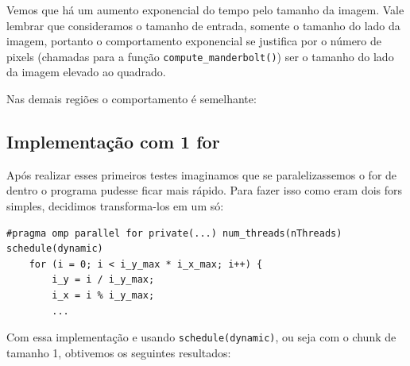 \documentclass[12pt]{article}
\newcommand{\code}[1]{\texttt{#1}}
\begin{document}
Vemos que há um aumento exponencial do tempo pelo tamanho da imagem. Vale lembrar que consideramos o tamanho de entrada, somente o tamanho do lado da imagem, portanto o comportamento exponencial se justifica por o número de pixels (chamadas para a função \code{compute\_manderbolt()}) ser o tamanho do lado da imagem elevado ao quadrado.

Nas demais regiões o comportamento é semelhante:

\begin{figure}[H]
\end{figure}

\subsection{Implementação com 1 for}
Após realizar esses primeiros testes imaginamos que se paralelizassemos o for de dentro o programa pudesse ficar mais rápido. Para fazer isso como eram dois fors simples, decidimos transforma-los em um só:

\begin{lstlisting}[style=CStyle]
    #pragma omp parallel for private(...) num_threads(nThreads) schedule(dynamic)
    for (i = 0; i < i_y_max * i_x_max; i++) {
        i_y = i / i_y_max;
        i_x = i % i_y_max;
        ...
\end{lstlisting}

Com essa implementação e usando \code{schedule(dynamic)}, ou seja com o chunk de tamanho 1, obtivemos os seguintes resultados:
\end{document}
